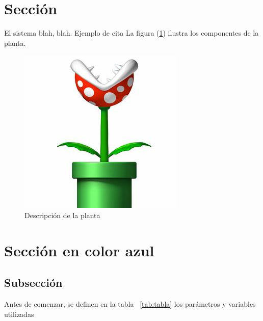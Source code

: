 \section{Sección}
El sistema blah, blah. Ejemplo de cita \citep{texbook}
La figura (\ref{planta})                     %
 ilustra los componentes de la planta.

\begin{figure}
  \centering
    \includegraphics[scale=0.5]{Capitulo3/figs/planta.jpg}      %
  \caption{Descripción de la planta}            %
  \label{planta}                            %
\end{figure}




\section{\textcolor{Azul}{Sección en color azul}}
\subsection{Subsección}
Antes de comenzar, se definen  en la tabla ~\ref{tab:tabla} los parámetros y variables utilizadas

